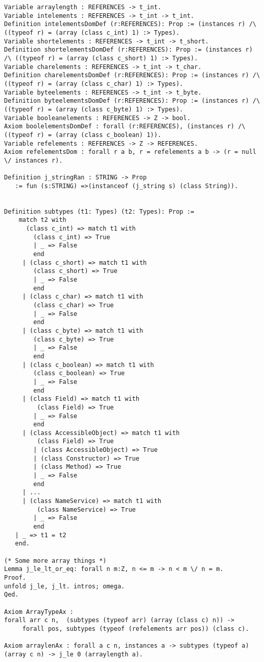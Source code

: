 \begin{verbatim}
Variable arraylength : REFERENCES -> t_int.
Variable intelements : REFERENCES -> t_int -> t_int.
Definition intelementsDomDef (r:REFERENCES): Prop := (instances r) /\ ((typeof r) = (array (class c_int) 1) :> Types).
Variable shortelements : REFERENCES -> t_int -> t_short.
Definition shortelementsDomDef (r:REFERENCES): Prop := (instances r) /\ ((typeof r) = (array (class c_short) 1) :> Types).
Variable charelements : REFERENCES -> t_int -> t_char.
Definition charelementsDomDef (r:REFERENCES): Prop := (instances r) /\ ((typeof r) = (array (class c_char) 1) :> Types).
Variable byteelements : REFERENCES -> t_int -> t_byte.
Definition byteelementsDomDef (r:REFERENCES): Prop := (instances r) /\ ((typeof r) = (array (class c_byte) 1) :> Types).
Variable booleanelements : REFERENCES -> Z -> bool.
Axiom boolelementsDomDef : forall (r:REFERENCES), (instances r) /\ ((typeof r) = (array (class c_boolean) 1)).
Variable refelements : REFERENCES -> Z -> REFERENCES.
Axiom refelementsDom : forall r a b, r = refelements a b -> (r = null \/ instances r).

Definition j_stringRan : STRING -> Prop 
   := fun (s:STRING) =>(instanceof (j_string s) (class String)).


Definition subtypes (t1: Types) (t2: Types): Prop :=
    match t2 with
      (class c_int) => match t1 with
        (class c_int) => True
        | _ => False
        end
     | (class c_short) => match t1 with
        (class c_short) => True
        | _ => False
        end
     | (class c_char) => match t1 with
        (class c_char) => True
        | _ => False
        end
     | (class c_byte) => match t1 with
        (class c_byte) => True
        | _ => False
        end
     | (class c_boolean) => match t1 with
        (class c_boolean) => True
        | _ => False
        end
     | (class Field) => match t1 with
         (class Field) => True
        | _ => False
        end
     | (class AccessibleObject) => match t1 with
         (class Field) => True
        | (class AccessibleObject) => True
        | (class Constructor) => True
        | (class Method) => True
        | _ => False
        end
     | ...
     | (class NameService) => match t1 with
         (class NameService) => True
        | _ => False
        end
   | _ => t1 = t2
   end.

(* Some more array things *)
Lemma j_le_lt_or_eq: forall n m:Z, n <= m -> n < m \/ n = m.
Proof.
unfold j_le, j_lt. intros; omega.
Qed.

Axiom ArrayTypeAx :
forall arr c n,  (subtypes (typeof arr) (array (class c) n)) -> 
     forall pos, subtypes (typeof (refelements arr pos)) (class c).

Axiom arraylenAx : forall a c n, instances a -> subtypes (typeof a) (array c n) -> j_le 0 (arraylength a).
\end{verbatim}
